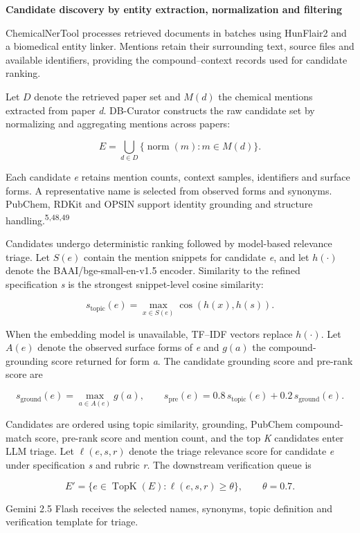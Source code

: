 \documentclass[
]{article}
\begin{document}
\textbf{Candidate discovery by entity extraction, normalization and filtering}

ChemicalNerTool processes retrieved documents in batches using HunFlair2 and a biomedical entity linker. Mentions retain their surrounding text, source files and available identifiers, providing the compound--context records used for candidate ranking.

Let $D$ denote the retrieved paper set and $M(d)$ the chemical mentions extracted from paper \emph{d}. DB-Curator constructs the raw candidate set by normalizing and aggregating mentions across papers:

\[E=\bigcup_{d\in D}\{\operatorname{norm}(m):m\in M(d)\}.\]

Each candidate \emph{e} retains mention counts, context samples, identifiers and surface forms. A representative name is selected from observed forms and synonyms. PubChem, RDKit and OPSIN support identity grounding and structure handling.\textsuperscript{5,48,49}

Candidates undergo deterministic ranking followed by model-based relevance triage. Let $S(e)$ contain the mention snippets for candidate \emph{e}, and let $h(\cdot)$ denote the BAAI/bge-small-en-v1.5 encoder. Similarity to the refined specification \emph{s} is the strongest snippet-level cosine similarity:

\[s_{\mathrm{topic}}(e)=\max_{x\in S(e)}\operatorname{cos}\!\left(h(x),h(s)\right).\]

When the embedding model is unavailable, TF--IDF vectors replace $h(\cdot)$. Let $A(e)$ denote the observed surface forms of \emph{e} and $g(a)$ the compound-grounding score returned for form \emph{a}. The candidate grounding score and pre-rank score are

\[s_{\mathrm{ground}}(e)=\max_{a\in A(e)}g(a),\qquad
s_{\mathrm{pre}}(e)=0.8\,s_{\mathrm{topic}}(e)+0.2\,s_{\mathrm{ground}}(e).\]

Candidates are ordered using topic similarity, grounding, PubChem compound-match score, pre-rank score and mention count, and the top \emph{K} candidates enter LLM triage. Let $\ell(e,s,r)$ denote the triage relevance score for candidate \emph{e} under specification \emph{s} and rubric \emph{r}. The downstream verification queue is

\[E'=\{e\in\operatorname{TopK}(E):\ell(e,s,r)\geq\theta\},\qquad \theta=0.7.\]

Gemini 2.5 Flash receives the selected names, synonyms, topic definition and verification template for triage.
\end{document}
